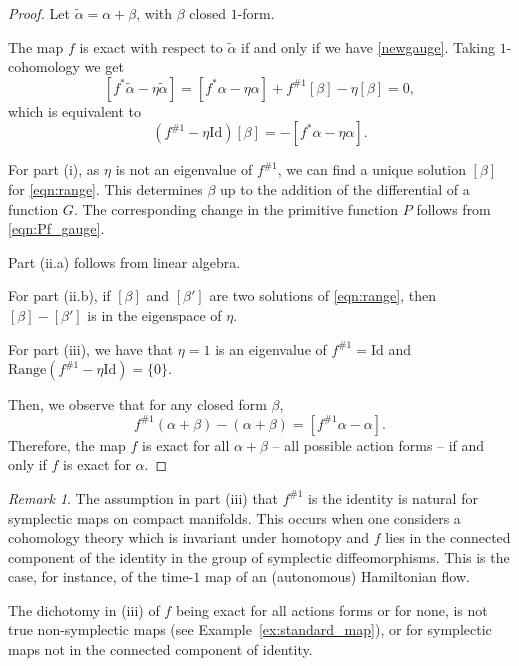 \documentclass[11pt]{amsart}
\theoremstyle{definition}
\theoremstyle{remark}
\newtheorem{rem}[thm]{Remark}
\numberwithin{equation}{section}
\begin{document}
\begin{proof}
Let  $\tilde\alpha=\alpha +\beta$, with $\beta$ closed $1$-form.


The map $f$ is exact with respect to $\tilde \alpha$  if and only if we have \eqref{newgauge}.
Taking $1$-cohomology   we get
  \begin{equation}\label{transformedgauge}
    [f^* {\tilde \alpha} -\eta {\tilde \alpha}]
    = [f^* { \alpha} -\eta {\alpha}] + f^{\#1} [\beta] -\eta [\beta]=0, \end{equation}
which is equivalent to
\begin{equation}\label{eqn:range} (f^{\#1}-\eta\textrm{Id})[\beta]=- [f^*\alpha-\eta\alpha].\end{equation}

  For part (i), as $\eta$ is not an eigenvalue of $f^{\#1}$,  we can find a unique solution $[\beta]$ for \eqref{eqn:range}.
This determines $\beta$ up to
    the addition of  the differential of a function $G$.
    The corresponding change in the primitive function $P$ follows from \eqref{eqn:Pf_gauge}.

Part (ii.a) follows from linear algebra.

For part (ii.b), if $[\beta]$ and $[\beta']$ are two solutions of  \eqref{eqn:range}, then $[\beta]-[\beta']$ is in the eigenspace of $\eta$.


For part (iii),
we have that $\eta=1$ is an eigenvalue of $f^{\#1}=\textrm{Id} $ and   $\textrm{Range}(f^{\#1}-\eta\textrm{Id}) =\{0\}$.

Then,  we observe that for any closed form $\beta$,
\[
f^{\#1}(\alpha +  \beta) - (\alpha + \beta) =
[f^{\#1} \alpha - \alpha] .
\]
Therefore, the map $f$ is exact for all $\alpha + \beta$  --
all possible action forms -- if and only if $f$ is exact for $\alpha$.
\end{proof}

\begin{rem}\label{maybeout}
The assumption in part (iii)   that $f^{\#1}$ is the identity
is natural for  symplectic maps on compact manifolds.
This occurs  when one considers a cohomology theory
which is invariant under homotopy and $f$ lies in
the connected component of the identity in the group of symplectic diffeomorphisms.
This is the case, for instance, of the time-$1$ map  of  an (autonomous) Hamiltonian flow.

The dichotomy in (iii) of $f$ being exact for all actions forms or for none,
is not true non-symplectic maps (see Example~\ref{ex:standard_map}),
or for symplectic maps not in the connected component of identity.
\end{rem}
\end{document}
